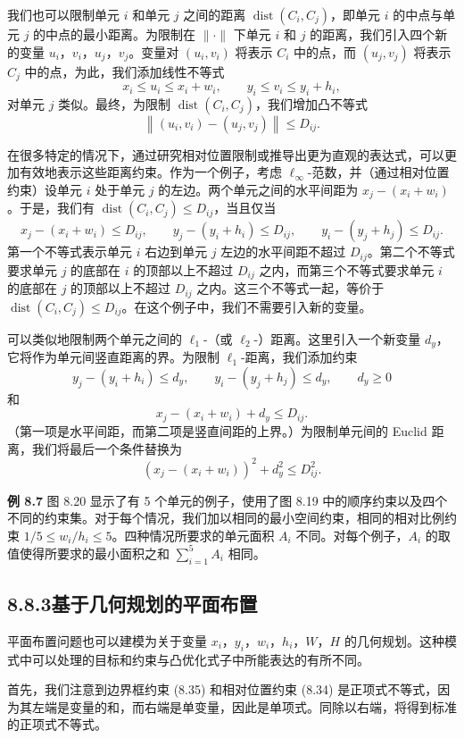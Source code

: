 \documentclass[UTF8,12pt,a4paper,fontset=fandol]{ctexart}
\begin{document}
我们也可以限制单元 $i$ 和单元 $j$ 之间的距离 $\operatorname{dist}(C_i,C_j)$，即单元 $i$ 的中点与单元 $j$ 的中点的最小距离。为限制在 $\|\cdot\|$ 下单元 $i$ 和 $j$ 的距离，我们引入四个新的变量 $u_i$，$v_i$，$u_j$，$v_j$。变量对 $(u_i,v_i)$ 将表示 $C_i$ 中的点，而 $(u_j,v_j)$ 将表示 $C_j$ 中的点，为此，我们添加线性不等式
\[
x_i\leq u_i\leq x_i+w_i,\qquad y_i\leq v_i\leq y_i+h_i,
\]
对单元 $j$ 类似。最终，为限制 $\operatorname{dist}(C_i,C_j)$，我们增加凸不等式
\[
\left\|(u_i,v_i)-(u_j,v_j)\right\|\leq D_{ij}.
\]

在很多特定的情况下，通过研究相对位置限制或推导出更为直观的表达式，可以更加有效地表示这些距离约束。作为一个例子，考虑 $\ell_\infty$-范数，并（通过相对位置约束）设单元 $i$ 处于单元 $j$ 的左边。两个单元之间的水平间距为 $x_j-(x_i+w_i)$。于是，我们有 $\operatorname{dist}(C_i,C_j)\leq D_{ij}$，当且仅当
\[
x_j-(x_i+w_i)\leq D_{ij},\qquad y_j-(y_i+h_i)\leq D_{ij},\qquad y_i-(y_j+h_j)\leq D_{ij}.
\]
第一个不等式表示单元 $i$ 右边到单元 $j$ 左边的水平间距不超过 $D_{ij}$。第二个不等式要求单元 $j$ 的底部在 $i$ 的顶部以上不超过 $D_{ij}$ 之内，而第三个不等式要求单元 $i$ 的底部在 $j$ 的顶部以上不超过 $D_{ij}$ 之内。这三个不等式一起，等价于 $\operatorname{dist}(C_i,C_j)\leq D_{ij}$。在这个例子中，我们不需要引入新的变量。

可以类似地限制两个单元之间的 $\ell_1$-（或 $\ell_2$-）距离。这里引入一个新变量 $d_y$，它将作为单元间竖直距离的界。为限制 $\ell_1$-距离，我们添加约束
\[
y_j-(y_i+h_i)\leq d_y,\qquad y_i-(y_j+h_j)\leq d_y,\qquad d_y\geq 0
\]
和
\[
x_j-(x_i+w_i)+d_y\leq D_{ij}.
\]
（第一项是水平间距，而第二项是竖直间距的上界。）为限制单元间的 Euclid 距离，我们将最后一个条件替换为
\[
\left(x_j-(x_i+w_i)\right)^2+d_y^2\leq D_{ij}^2.
\]

\noindent\textbf{例 8.7}
图 8.20 显示了有 5 个单元的例子，使用了图 8.19 中的顺序约束以及四个不同的约束集。对于每个情况，我们加以相同的最小空间约束，相同的相对比例约束 $1/5\leq w_i/h_i\leq 5$。四种情况所要求的单元面积 $A_i$ 不同。对每个例子，$A_i$ 的取值使得所要求的最小面积之和 $\sum_{i=1}^5A_i$ 相同。

\subsection*{8.8.3\quad 基于几何规划的平面布置}

平面布置问题也可以建模为关于变量 $x_i$，$y_i$，$w_i$，$h_i$，$W$，$H$ 的几何规划。这种模式中可以处理的目标和约束与凸优化式子中所能表达的有所不同。

首先，我们注意到边界框约束 (8.35) 和相对位置约束 (8.34) 是正项式不等式，因为其左端是变量的和，而右端是单变量，因此是单项式。同除以右端，将得到标准的正项式不等式。
\end{document}
